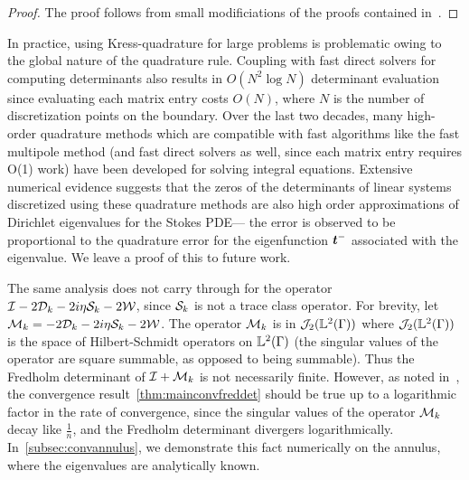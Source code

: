 \begin{proof}
  The proof follows from small modificiations of the
  proofs contained in~\cite{zhao2015robust}. 
\end{proof}

\begin{remark}
In practice, using Kress-quadrature for large
problems is problematic owing to the global
nature of the quadrature rule.
%
Coupling with fast direct solvers for computing determinants also results in $O(N^2 \log{N})$ 
determinant evaluation since evaluating each matrix entry costs $O(N)$, where 
$N$ is the number of discretization points on the boundary.
Over the last two decades, many high-order quadrature methods which are compatible with
fast algorithms like the fast multipole method (and fast direct solvers as well, 
since each matrix entry requires O(1) work) have been developed for solving
integral equations.
Extensive numerical evidence suggests that the zeros of the 
determinants of linear systems discretized using 
these quadrature methods are also high order approximations of Dirichlet eigenvalues
for the Stokes PDE--- the error is observed to be proportional to the quadrature error
for the eigenfunction ${\boldsymbol t}^{-}$ associated with the eigenvalue.
We leave a proof of this to future work.
\end{remark}

\begin{remark}
The same analysis does not carry through for the operator
$\mathcal I - 2 {\mathcal D}_{k} - 2i\eta {\mathcal S}_{k} - 2{\mathcal W}$, 
since ${\mathcal S}_{k}$ is not a trace class operator.
For brevity, let ${\mathcal M}_{k} = -2{\mathcal D}_{k} - 2i\eta {\mathcal S}_{k} - 2{\mathcal W}$.
The operator ${\mathcal M}_{k}$ is 
in ${\mathcal J}_{2}({\mathbb L}^{2}(\Gamma))$ where
${\mathcal J}_{2}({\mathbb L}^{2}(\Gamma))$ is the space of Hilbert-Schmidt operators
on ${\mathbb L}^{2}(\Gamma)$ (the singular values of the operator are square
summable, as opposed to being summable).
Thus the Fredholm determinant of $\mathcal I + {\mathcal M}_{k}$
is not necessarily finite. 
However, as noted in~\cite{zhao2015robust}, the convergence
result~\cref{thm:mainconvfreddet}
should be true up to a logarithmic factor in the rate
of convergence, since the singular values of the operator
${\mathcal M}_{k}$ decay like $\frac{1}{n}$, and the
Fredholm determinant divergers logarithmically. 
In~\cref{subsec:convannulus}, we demonstrate this fact
numerically on the annulus, where the eigenvalues are
analytically known. 
\end{remark}
